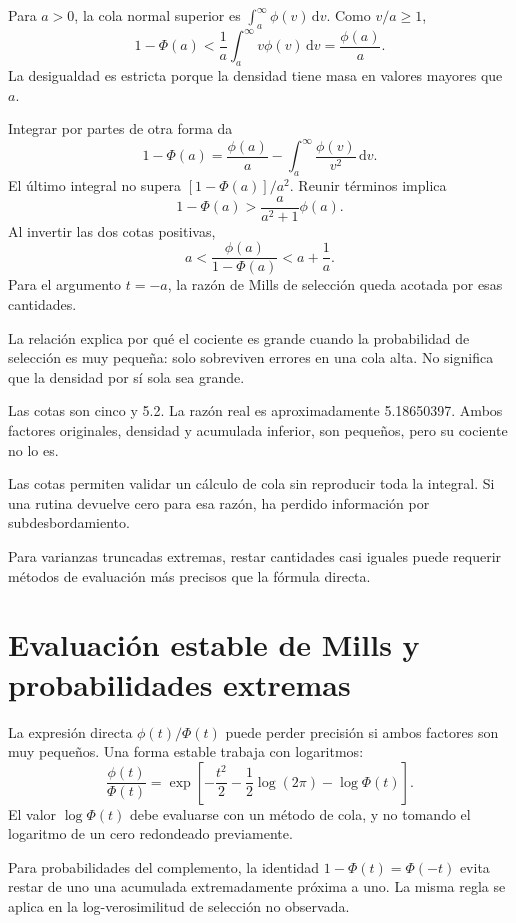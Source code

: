 \documentclass[11pt,a4paper]{article}
\newcommand{\dd}{\,\mathrm d}
\begin{document}
Para \(a>0\), la cola normal superior es
\(\int_a^\infty\phi(v)\dd v\).
Como \(v/a\ge1\),
\[
1-\Phi(a)<\frac1a\int_a^\infty v\phi(v)\dd v
=\frac{\phi(a)}a.
\]
La desigualdad es estricta
porque la densidad tiene masa
en valores mayores que \(a\).

Integrar por partes de otra forma da
\[
1-\Phi(a)=\frac{\phi(a)}a
-\int_a^\infty\frac{\phi(v)}{v^2}\dd v.
\]
El último integral no supera
\([1-\Phi(a)]/a^2\).
Reunir términos implica
\[
1-\Phi(a)>
\frac{a}{a^2+1}\phi(a).
\]
Al invertir las dos cotas positivas,
\[
\boxed{
a<\frac{\phi(a)}{1-\Phi(a)}<a+\frac1a}.
\]
Para el argumento \(t=-a\),
la razón de Mills de selección
queda acotada por esas cantidades.

La relación explica por qué
el cociente es grande cuando
la probabilidad de selección
es muy pequeña: solo sobreviven
errores en una cola alta.
No significa que la densidad
por sí sola sea grande.

\begin{ejemplo}
Las cotas son cinco y 5.2.
La razón real es aproximadamente 5.18650397.
Ambos factores originales,
densidad y acumulada inferior,
son pequeños, pero su cociente
no lo es.
\end{ejemplo}
Las cotas permiten validar
un cálculo de cola sin
reproducir toda la integral.
Si una rutina devuelve cero
para esa razón, ha perdido
información por subdesbordamiento.

Para varianzas truncadas extremas,
restar cantidades casi iguales
puede requerir métodos de evaluación
más precisos que la fórmula directa.


\clearpage
\section{Evaluación estable de Mills y probabilidades extremas}

La expresión directa
\(\phi(t)/\Phi(t)\) puede perder precisión
si ambos factores son muy pequeños.
Una forma estable trabaja con logaritmos:
\[
\frac{\phi(t)}{\Phi(t)}
=\exp\left[-\frac{t^2}{2}
-\frac12\log(2\pi)-\log\Phi(t)\right].
\]
El valor \(\log\Phi(t)\) debe
evaluarse con un método de cola,
y no tomando el logaritmo
de un cero redondeado previamente.

Para probabilidades del complemento,
la identidad \(1-\Phi(t)=\Phi(-t)\)
evita restar de uno una
acumulada extremadamente próxima a uno.
La misma regla se aplica
en la log-verosimilitud de
selección no observada.
\end{document}

